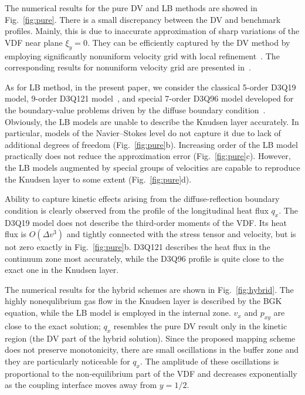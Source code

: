 \documentclass{aip-cp}
\newcommand{\OO}[1]{O(#1)}
\begin{document}
The numerical results for the pure DV and LB methods are showed in Fig.~\ref{fig:pure}.
There is a small discrepancy between the DV and benchmark profiles.
Mainly, this is due to inaccurate approximation of sharp variations of the VDF near plane \(\xi_y=0\).
They can be efficiently captured by the DV method by employing significantly nonuniform velocity grid
with local refinement~\cite{Ohwada1990, Wu2014, Rogozin2016}.
The corresponding results for nonuniform velocity grid are presented in~\cite{Aristov2019}.

As for LB method, in the present paper, we consider the classical 5-order D3Q19 model, 9-order D3Q121 model~\cite{Shan2010},
and special 7-order D3Q96 model developed for the boundary-value problems driven by the diffuse boundary condition~\cite{Feuchter2016}.
Obviously, the LB models are unable to describe the Knudsen layer accurately.
In particular, models of the Navier--Stokes level do not capture it due to lack of additional degrees of freedom (Fig.~\ref{fig:pure}b).
Increasing order of the LB model practically does not reduce the approximation error (Fig.~\ref{fig:pure}c).
However, the LB models augmented by special groups of velocities are capable to reproduce the Knudsen layer to some extent (Fig.~\ref{fig:pure}d).

Ability to capture kinetic effects arising from the diffuse-reflection boundary condition
is clearly observed from the profile of the longitudinal heat flux \(q_x\).
The D3Q19 model does not describe the third-order moments of the VDF.
Its heat flux is \(\OO{\Delta v^3}\) and tightly connected with the stress tensor and velocity,
but is not zero exactly in Fig.~\ref{fig:pure}b.
D3Q121 describes the heat flux in the continuum zone most accurately,
while the D3Q96 profile is quite close to the exact one in the Knudsen layer.

The numerical results for the hybrid schemes are shown in Fig.~\ref{fig:hybrid}.
The highly nonequlibrium gas flow in the Knudsen layer is described by the BGK equation,
while the LB model is employed in the internal zone.
\(v_x\) and \(p_{xy}\) are close to the exact solution;
\(q_x\) resembles the pure DV result only in the kinetic region (the DV part of the hybrid solution).
Since the proposed mapping scheme does not preserve monotonicity,
there are small oscillations in the buffer zone and they are particularly noticeable for \(q_x\).
The amplitude of these oscillations is proportional to the non-equilibrium part of the VDF
and decreases exponentially as the coupling interface moves away from \(y=1/2\).
\end{document}
